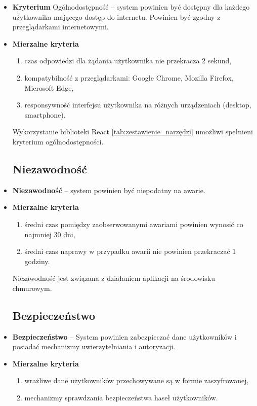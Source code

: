 \begin{itemize}
	\item \textbf{Kryterium} Ogólnodostępność -- system powinien być dostępny dla każdego użytkownika mającego dostęp do internetu. Powinien być zgodny z przeglądarkami internetowymi.
	\item \textbf{Mierzalne kryteria}
		\begin{enumerate}
			\item czas odpowiedzi dla żądania użytkownika nie przekracza 2 sekund,
			\item kompatybilność z przeglądarkami: Google Chrome, Mozilla Firefox, Microsoft Edge,
			\item responsywność interfejsu użytkownika na różnych urządzeniach (desktop, smartphone).
		\end{enumerate}
	Wykorzystanie biblioteki React \ref{tab:zestawienie_narzędzi} umożliwi spełnieni kryterium ogólnodostępności.
		
\subsection{Niezawodność}
	\item \textbf{Niezawodność} -- system powinien być niepodatny na awarie.
	\item \textbf{Mierzalne kryteria}
		\begin{enumerate}
			\item średni czas pomiędzy zaobserwowanymi awariami powinien wynosić co najmniej 30 dni,
			\item średni czas naprawy w przypadku awarii nie powinien przekraczać 1 godziny.
		\end{enumerate}
	Niezawodność jest związana z działaniem aplikacji na środowisku chmurowym. 
	
	\subsection{Bezpieczeństwo}
	
	\item \textbf{Bezpieczeństwo} -- System powinien zabezpieczać dane użytkowników i posiadać mechanizmy uwierzytelniania i autoryzacji.
	\item \textbf{Mierzalne kryteria}
		\begin{enumerate}
			\item wrażliwe dane użytkowników przechowywane są w formie zaszyfrowanej,
			\item mechanizmy sprawdzania bezpieczeństwa haseł użytkowników.
		\end{enumerate}
		

\end{itemize}
